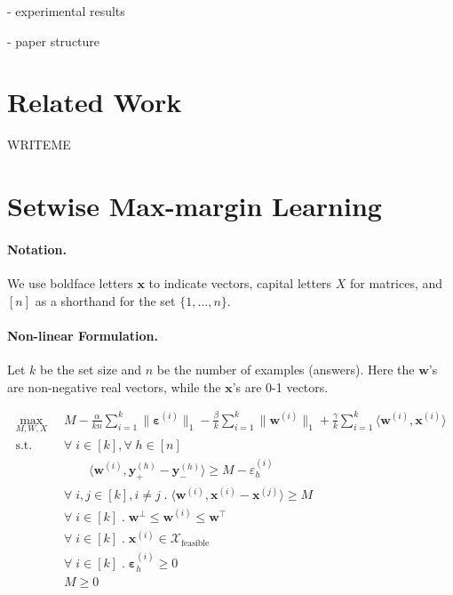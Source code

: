 \documentclass{article}
\renewcommand\[{\begin{equation}}
\renewcommand\]{\end{equation}}
\newcommand{\calvar}[1]{\ensuremath{\mathcal{#1}}}
\newcommand{\calX}{\calvar{X}}
\newcommand{\vecvar}[1]{\ensuremath{\boldsymbol{#1}}}
\newcommand{\vw}{\vecvar{w}}
\newcommand{\vx}{\vecvar{x}}
\newcommand{\vy}{\vecvar{y}}
\newcommand{\veps}{\vecvar{\varepsilon}}
\begin{document}
- experimental results

- paper structure


\section{Related Work}

WRITEME

\section{Setwise Max-margin Learning}

\paragraph{Notation.} We use boldface letters $\vx$ to indicate vectors,
capital letters $X$ for matrices, and $[n]$ as a shorthand for the set $\{1, \ldots, n\}$.

\paragraph{Non-linear Formulation.}

Let $k$ be the set size and $n$ be the number of examples (answers). Here
the $\vw$'s are non-negative real vectors, while the $\vx$'s are 0-1
vectors.

{\footnotesize

\begin{align}
    \max_{M, W, X}
        & \;\; M - \frac{\alpha}{k n} \sum_{i=1}^k \| \veps^{(i)} \|_1 - \frac{\beta}{k} \sum_{i=1}^k \| \vw^{(i)} \|_1 + \frac{\gamma}{k} \sum_{i=1}^k \langle \vw^{(i)}, \vx^{(i)} \rangle
        \nonumber
    \\
    \text{s.t.}
        & \;\; \forall \; i \in [k], \forall \; h \in [n] \nonumber
    \\
        & \;\; \qquad \langle \vw^{(i)}, \vy^{(h)}_+ - \vy^{(h)}_- \rangle \geq M - \varepsilon^{(i)}_h
    \\
        & \;\; \forall \; i, j \in [k], i \neq j \;.\; \langle \vw^{(i)}, \vx^{(i)} - \vx^{(j)} \rangle \geq M \label{eq:wxconstr}
    \\
        & \;\; \forall \; i \in [k] \;.\; \vw^\bot \leq \vw^{(i)} \leq \vw^\top \label{eq:wbounds}
    \\
        & \;\; \forall \; i \in [k] \;.\; \vx^{(i)} \in \calX_{\text{feasible}}
    \\
        & \;\; \forall \; i \in [k] \;.\; \veps^{(i)}_h \geq 0
    \\
        & \;\; M \geq 0
\end{align}

}
\end{document}
